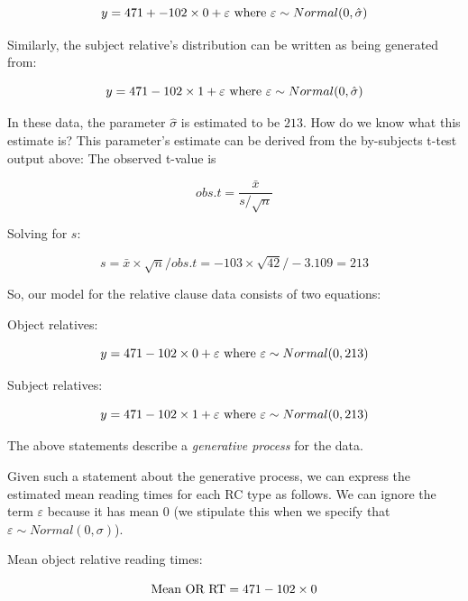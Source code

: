 \documentclass[12pt,]{krantz}
\begin{document}
\begin{equation}
y = 471 + -102 \times 0 + \varepsilon \hfill \hbox{ where } \varepsilon \sim Normal(0,\hat\sigma)
\end{equation}

Similarly, the subject relative's distribution can be written as being generated from:

\begin{equation}
y = 471 - 102 \times 1 + \varepsilon \hbox{ where } \varepsilon \sim Normal(0,\hat\sigma)
\end{equation}

In these data, the parameter \(\hat\sigma\) is estimated to be \(213\). How do we know what this estimate is? This parameter's estimate can be derived from the by-subjects t-test output above: The observed t-value is

\begin{equation}
obs.t= \frac{\bar{x}}{s/\sqrt{n}} 
\end{equation}

Solving for \(s\):

\begin{equation}
 s = \bar{x} \times \sqrt{n}/obs.t = -103 \times \sqrt{42}/-3.109  =  213
\end{equation}

So, our model for the relative clause data consists of two equations:

Object relatives:

\begin{equation}
y = 471 -102\times 0 + \varepsilon \hfill \hbox{ where } \varepsilon \sim Normal(0,213)
\end{equation}

Subject relatives:

\begin{equation}
y = 471 - 102\times 1 + \varepsilon \hbox{ where } \varepsilon \sim Normal(0,213)
\end{equation}

The above statements describe a \emph{generative process} for the data.

Given such a statement about the generative process, we can express the estimated mean reading times for each RC type as follows. We can ignore the term \(\varepsilon\) because it has mean 0 (we stipulate this when we specify that \(\varepsilon \sim Normal(0,\sigma)\)).

Mean object relative reading times:

\begin{equation}
\hbox{Mean OR RT}= 471 -102\times 0
\end{equation}
\end{document}

